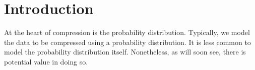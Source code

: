\section{Introduction}
\label{sec:pdf_compression/intro}


At the heart of compression is the probability distribution.
Typically, we model the data to be compressed using a probability distribution.
It is less common to model the probability distribution itself.
Nonetheless, as will soon see, there is potential value in doing so.

